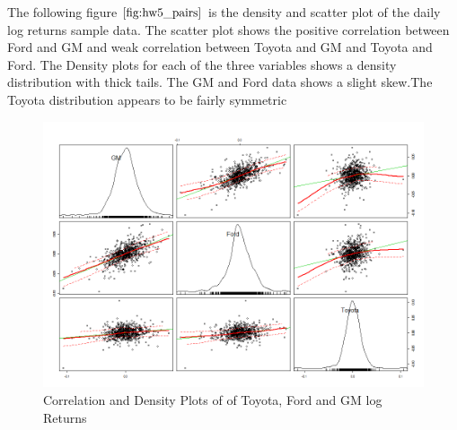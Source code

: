 \documentclass[twoside,12pt]{article}
\begin{document}
\pagebreak
\FloatBarrier
{
The following figure $\eqref{fig:hw5_pairs}$ is the density and scatter plot of the daily log returns sample data. The scatter plot shows the positive correlation between Ford and GM and weak correlation between Toyota and GM and Toyota and Ford. The Density plots for each of the three variables shows a density distribution with thick tails. The GM and Ford data shows a slight skew.The Toyota distribution appears to be fairly symmetric
\begin{figure}[htbp!]
     \begin{center}
            \hspace*{-1.5in}
            \includegraphics[width=1.35\textwidth]{charts/hw5_g_pairs}
    \end{center}
    \caption{%
     Correlation and Density Plots of of Toyota, Ford and GM log Returns
     }%
   \label{fig:hw5_pairs}
\end{figure}
}
\end{document}
